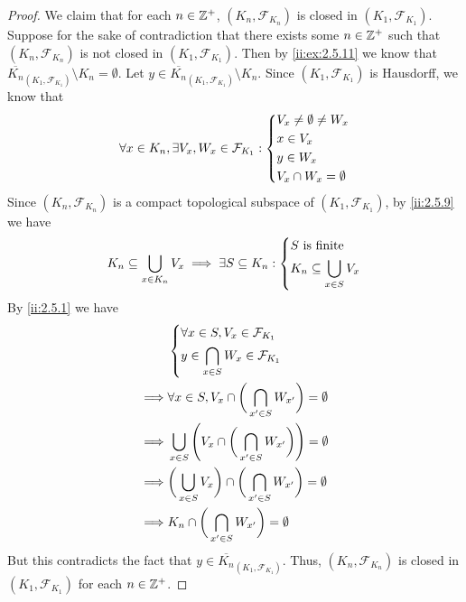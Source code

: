 \begin{proof}
  We claim that for each \(n \in \mathbb{Z}^+\), \((K_n, \mathcal{F}_{K_n})\) is closed in \((K_1, \mathcal{F}_{K_1})\).
  Suppose for the sake of contradiction that there exists some \(n \in \mathbb{Z}^+\) such that \((K_n, \mathcal{F}_{K_n})\) is not closed in \((K_1, \mathcal{F}_{K_1})\).
  Then by \cref{ii:ex:2.5.11} we know that \(\overline{K_n}_{(K_1, \mathcal{F}_{K_1})} \setminus K_n = \emptyset\).
  Let \(y \in \overline{K_n}_{(K_1, \mathcal{F}_{K_1})} \setminus K_n\).
  Since \((K_1, \mathcal{F}_{K_1})\) is Hausdorff, we know that
  \[
    \forall x \in K_n, \exists V_x, W_x \in \mathcal{F}_{K_1} : \begin{dcases}
      V_x \neq \emptyset \neq W_x \\
      x \in V_x                   \\
      y \in W_x                   \\
      V_x \cap W_x = \emptyset
    \end{dcases}
  \]
  Since \((K_n, \mathcal{F}_{K_n})\) is a compact topological subspace of \((K_1, \mathcal{F}_{K_1})\), by \cref{ii:2.5.9} we have
  \[
    K_n \subseteq \bigcup_{x \in K_n} V_x \implies \exists S \subseteq K_n : \begin{dcases}
      S \text{ is finite} \\
      K_n \subseteq \bigcup_{x \in S} V_x
    \end{dcases}
  \]
  By \cref{ii:2.5.1} we have
  \begin{align*}
             & \begin{dcases}
                 \forall x \in S, V_x \in \mathcal{F}_{K_1} \\
                 y \in \bigcap_{x \in S} W_x \in \mathcal{F}_{K_1}
               \end{dcases}                                         \\
    \implies & \forall x \in S, V_x \cap \bigg(\bigcap_{x' \in S} W_{x'}\bigg) = \emptyset              \\
    \implies & \bigcup_{x \in S} \Bigg(V_x \cap \bigg(\bigcap_{x' \in S} W_{x'}\bigg)\Bigg) = \emptyset \\
    \implies & \bigg(\bigcup_{x \in S} V_x\bigg) \cap \bigg(\bigcap_{x' \in S} W_{x'}\bigg) = \emptyset \\
    \implies & K_n \cap \bigg(\bigcap_{x' \in S} W_{x'}\bigg) = \emptyset
  \end{align*}
  But this contradicts the fact that \(y \in \overline{K_n}_{(K_1, \mathcal{F}_{K_1})}\).
  Thus, \((K_n, \mathcal{F}_{K_n})\) is closed in \((K_1, \mathcal{F}_{K_1})\) for each \(n \in \mathbb{Z}^+\).


\end{proof}
